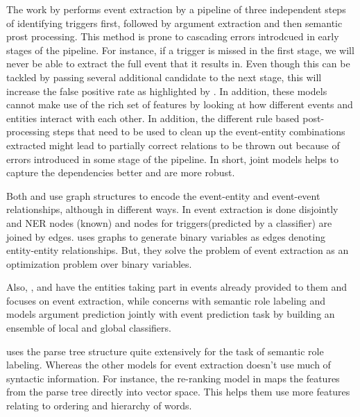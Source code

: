 The work by \citeauthor{bjorne} performs event extraction by a pipeline of three independent steps of identifying triggers first, followed by argument extraction and then semantic prost processing. This method  is prone to cascading errors introdcued in early stages of the pipeline. For instance, if a trigger is missed in the first stage, we will never be able to extract the full event that it results in. Even though this can be tackled by passing several additional candidate to the next stage, this will increase the false positive rate as highlighted by \cite{miwa2010c}. In addition, these models cannot make use of the rich set of features by looking at how different events and entities interact with each other. In addition, the different rule based post-processing steps that need to be used to clean up the event-entity combinations extracted might lead to partially correct relations to be thrown out because of errors introduced in some stage of the pipeline. In short, joint models helps to capture the dependencies better and are more robust.

Both \citeauthor{bjorne} and \citeauthor{riedelmc} use graph structures to encode the event-entity and event-event relationships, although in different ways. In \citeauthor{bjorne} event extraction is done disjointly and NER nodes (known) and nodes for triggers(predicted by a classifier) are joined by edges. \citeauthor{riedelmc} uses graphs to generate binary variables as edges denoting entity-entity relationships. But, they solve the problem of event extraction as an optimization problem over binary variables.

Also, \citeauthor{bjorne}, \citeauthor{chju2008ec} and \citeauthor{riedelmc} have the entities taking part in events already provided to them and focuses on event extraction, while \citeauthor{toutanova} concerns with semantic role labeling and models argument prediction jointly with event prediction task by building an ensemble of local and global classifiers.

\citeauthor{riedelmc} uses the parse tree structure quite extensively for the task of semantic role labeling. Whereas the other models for event extraction doesn't use much of syntactic information. For instance, the re-ranking model in \citeauthor{riedelmc} maps the features from the parse tree directly into vector space. This helps them use more features relating to ordering and hierarchy of words.
